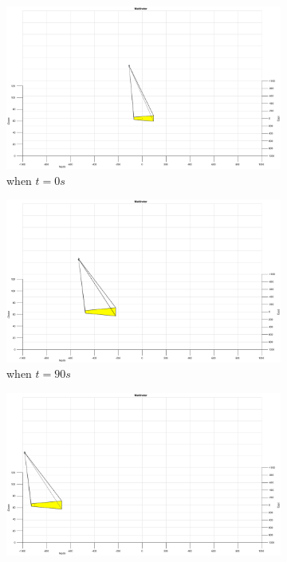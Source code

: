 \begin{figure}[htbp]
	\centering
	\begin{subfigure}[t]{0.32\linewidth}
		\includegraphics[width=\textwidth]{images/chapter4/image_UAV_-5mps}
		\caption{when $t=0s$}
	\end{subfigure}
	\begin{subfigure}[t]{0.32\linewidth}
		\includegraphics[width=\textwidth]{images/chapter4/image_UAV_-5mps_90s}
		\caption{when $t=90s$}
	\end{subfigure}
	\begin{subfigure}[t]{0.32\linewidth}
		\includegraphics[width=\textwidth]{images/chapter4/image_UAV_-5mps_180s}

\end{subfigure}
\end{figure}

